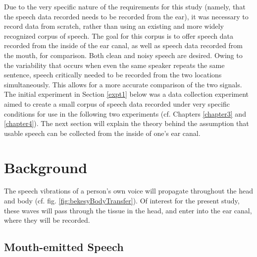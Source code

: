 \documentclass[dissertation,copyright]{uathesis}
\begin{document}
Due to the very specific nature of the requirements for this study (namely, that the speech data recorded needs to be recorded from the ear), it was necessary to record data from scratch, rather than using an existing and more widely recognized corpus of speech.  The goal for this corpus is to offer speech data recorded from the inside of the ear canal, as well as speech data recorded from the mouth, for comparison.  Both clean and noisy speech are desired.
Owing to the variability that occurs when even the same speaker repeats the same sentence, speech critically needed to be recorded from the two locations simultaneously.  This allows for a more accurate comparison of the two signals.
The initial experiment in Section \ref{expt1} below was a data collection experiment aimed to create a small corpus of speech data recorded under very specific conditions for use in the following two experiments (cf. Chapters \ref{chapter3} and \ref{chapter4}).  The next section will explain the theory behind the assumption that usable speech can be collected from the inside of one's ear canal.

\section{Background}

The speech vibrations of a person's own voice will propagate throughout the head and body (cf. fig. \ref{fig:bekesyBodyTransfer}).  Of interest for the present study, these waves will pass through the tissue in the head, and enter into the ear canal, where they will be recorded.

\subsection{Mouth-emitted Speech}
\end{document}

